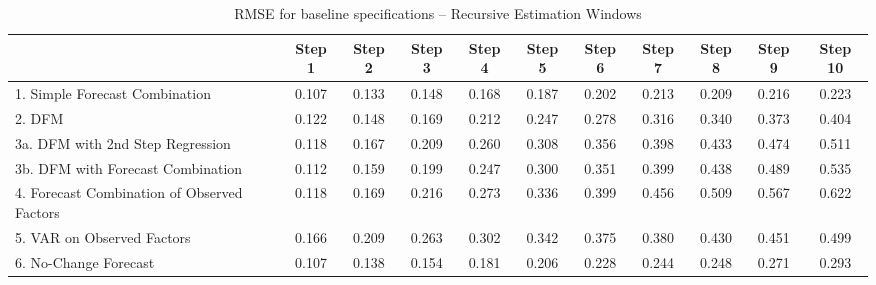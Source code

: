 \documentclass[11pt]{article}
\begin{document}
\newpage
{\normalsize \clearpage
\begin{table}
\center
\caption{RMSE for baseline specifications -- Recursive Estimation Windows} \label{table_rmse_baseline}
\begin{tabular}{|l|c|c|c|c|c|c|c|c|c|c|}
\hline
&Step 1 &Step 2 &Step 3 &Step 4 &Step 5 &Step 6 &Step 7 &Step 8 &Step 9 &Step 10\\
\hline
1. Simple Forecast Combination             &0.107&0.133&0.148&0.168&0.187&0.202&0.213&0.209&0.216&0.223\\
2. DFM                                                       &0.122&0.148&0.169&0.212&0.247&0.278&0.316&0.340&0.373&0.404\\
3a. DFM with 2nd Step Regression           &0.118&0.167&0.209&0.260&0.308&0.356&0.398&0.433&0.474&0.511\\
3b. DFM with Forecast Combination          &0.112&0.159&0.199&0.247&0.300&0.351&0.399&0.438&0.489&0.535\\
4. Forecast Combination of Observed Factors&0.118&0.169&0.216&0.273&0.336&0.399&0.456&0.509&0.567&0.622\\
5. VAR on Observed Factors                 &0.166&0.209&0.263&0.302&0.342&0.375&0.380&0.430&0.451&0.499\\
6. No-Change Forecast                      &0.107&0.138&0.154&0.181&0.206&0.228&0.244&0.248&0.271&0.293\\
\hline
\end{tabular}
\end{table}
}
\end{document}
